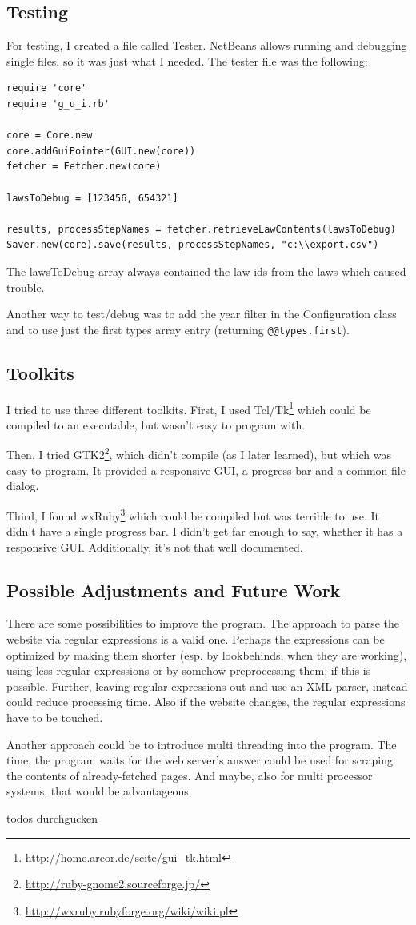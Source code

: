 \documentclass{scrartcl}
\begin{document}
\subsection{Testing}
For testing, I created a file called Tester. NetBeans allows running and debugging single files, so it was just what I needed. The tester file was the following:

\begin{verbatim}
require 'core'
require 'g_u_i.rb'

core = Core.new
core.addGuiPointer(GUI.new(core))
fetcher = Fetcher.new(core)

lawsToDebug = [123456, 654321]

results, processStepNames = fetcher.retrieveLawContents(lawsToDebug)
Saver.new(core).save(results, processStepNames, "c:\\export.csv")
\end{verbatim}
The lawsToDebug array always contained the law ids from the laws which caused trouble.

Another way to test/debug was to add the year filter in the Configuration class and to use just the first types array entry (returning \texttt{@@types.first}).



\subsection{Toolkits}
\label{Toolkits}
I tried to use three different toolkits. First, I used Tcl/Tk\footnote{\url{http://home.arcor.de/scite/gui_tk.html}} which could be compiled to an executable, but wasn't easy to program with.

Then, I tried GTK2\footnote{\url{http://ruby-gnome2.sourceforge.jp/}}, which didn't compile (as I later learned), but which was easy to program. It provided a responsive GUI, a progress bar and a common file dialog.

Third, I found wxRuby\footnote{\url{http://wxruby.rubyforge.org/wiki/wiki.pl}} which could be compiled but was terrible to use. It didn't have a single progress bar. I didn't get far enough to say, whether it has a responsive GUI. Additionally, it's not that well documented.



\subsection{Possible Adjustments and Future Work}
There are some possibilities to improve the program. The approach to parse the website via regular expressions is a valid one. Perhaps the expressions can be optimized by making them shorter (esp. by lookbehinds, when they are working), using less regular expressions or by somehow preprocessing them, if this is possible. Further, leaving regular expressions out and use an XML parser, instead could reduce processing time. Also if the website changes, the regular expressions have to be touched.

Another approach could be to introduce multi threading into the program. The time, the program waits for the web server's answer could be used for scraping the contents of already-fetched pages. And maybe, also for multi processor systems, that would be advantageous.



todos durchgucken
\end{document}
